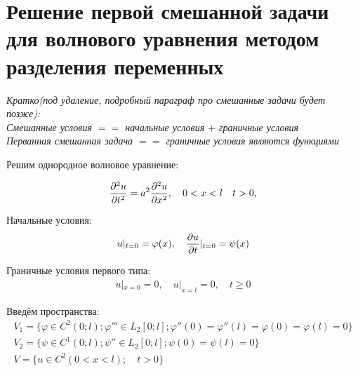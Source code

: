 \documentclass[../main.tex]{subfiles}
\begin{document}
\section{Решение первой смешанной задачи для волнового уравнения
  методом разделения переменных}
\textit{Кратко(под удаление, подробный параграф про смешанные задачи будет позже):\\
	Смешанные условия $==$ начальные условия $+$ граничные условия\\
	Перванная смешанная задача $==$ граничные условия являются функциями\\}

Решим однородное волновое уравнение:

\begin{gather}
	\label{eq:2.8.1}
	\frac{\partial^2 u}{\partial t^2} = a^2 \frac{\partial^2 u}{\partial x^2}, \quad 0<x<l \quad t>0,
\end{gather}

Начальные условия:
\begin{gather}
	\label{eq:2.8.2}
	u|_{t=0}=\varphi(x), \quad \frac{\partial u}{\partial t}|_{t=0}=\psi(x)
\end{gather}

Граничные условия первого типа:
\begin{gather}
	\label{eq:2.8.3}
	u|_{x=0}=0,\quad u|_{x=l}=0, \quad t\geq 0
\end{gather}

Введём пространства:
\begin{gather*}
	V_1=\{\varphi \in C^2(0;l); \varphi'''\in L_2[0;l];
	\varphi''(0) = \varphi''(l) = \varphi(0) = \varphi(l) = 0\}\\
	V_2=\{\psi \in C^1(0;l); \psi''\in L_2[0;l];
	\psi(0) = \psi(l) = 0\}\\
	V = \{u \in C^2(0<x<l);\quad t>0\}
\end{gather*}
\end{document}
